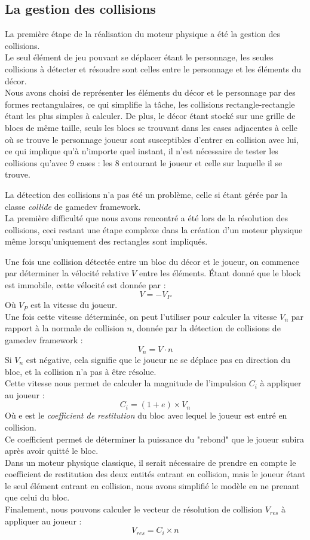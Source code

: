 \documentclass[10pt]{report}
\begin{document}
\subsection{La gestion des collisions}
La première étape de la réalisation du moteur physique a été la gestion des collisions.\\
Le seul élément de jeu pouvant se déplacer étant le personnage, les seules collisions à détecter et résoudre sont celles entre le personnage et les éléments du décor.\\
Nous avons choisi de représenter les éléments du décor et le personnage par des formes rectangulaires, ce qui simplifie la tâche, les collisions rectangle-rectangle étant les plus simples à calculer.
De plus, le décor étant stocké sur une grille de blocs de même taille, seuls les blocs se trouvant dans les cases adjacentes à celle où se trouve le personnage joueur sont susceptibles d'entrer en collision avec lui, ce qui implique qu'à n'importe quel instant, il n'est nécessaire de tester les collisions qu'avec 9 cases :
les 8 entourant le joueur et celle sur laquelle il se trouve.\par

La détection des collisions n'a pas été un problème, celle si étant gérée par la classe \emph{collide} de gamedev framework.\\
La première difficulté que nous avons rencontré a été lors de la résolution des collisions, ceci restant une étape complexe dans la création d'un moteur physique même lorsqu'uniquement des rectangles sont impliqués.\par

Une fois une collision détectée entre un bloc du décor et le joueur, on commence par déterminer la vélocité relative \(V\) entre les éléments.
Étant donné que le block est immobile, cette vélocité est donnée par :
\[ V =  - V_{P} \]
Où \(V_{P}\) est la vitesse du joueur.\\
Une fois cette vitesse déterminée, on peut l'utiliser pour calculer la vitesse \(V_{n}\) par rapport à la normale de collision \(n\), donnée par la détection de collisions de gamedev framework :
\[ V_{n} = V \cdot n \]
Si \(V_{n}\) est négative, cela signifie que le joueur ne se déplace pas en direction du bloc, et la collision n'a pas à être résolue.\\
Cette vitesse nous permet de calculer la magnitude de l'impulsion \(C_{i}\) à appliquer au joueur :\\
\[ C_{i} = (1 + e) \times V_{n} \]
Où e est le \emph{coefficient de restitution} du bloc avec lequel le joueur est entré en collision.\\
Ce coefficient permet de déterminer la puissance du "rebond" que le joueur subira après avoir quitté le bloc.\\
Dans un moteur physique classique, il serait nécessaire de prendre en compte le coefficient de restitution des deux entités entrant en collision, mais le joueur étant le seul élément entrant en collision, nous avons simplifié le modèle en ne prenant que celui du bloc.\\
Finalement, nous pouvons calculer le vecteur de résolution de collision \(V_{res}\) à appliquer au joueur :
\[V_{res} = C_{i} \times n \]
\end{document}
